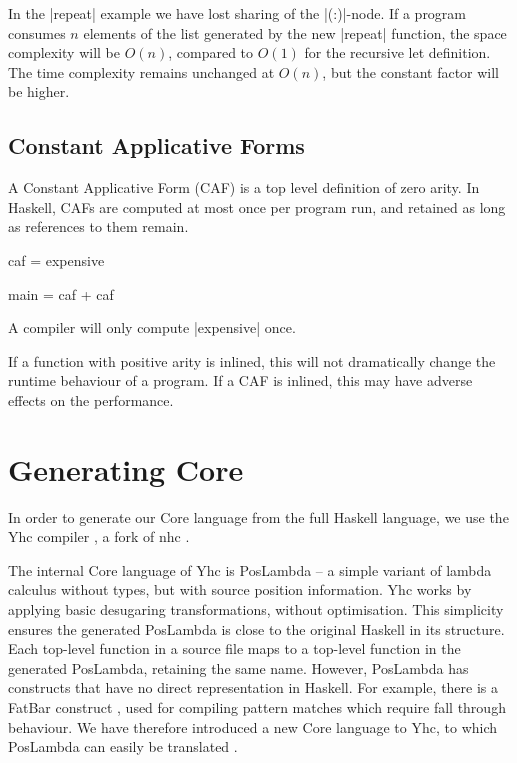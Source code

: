 In the |repeat| example we have lost sharing of the |(:)|-node. If a program consumes $n$ elements of the list generated by the new |repeat| function, the space complexity will be $O(n)$, compared to $O(1)$ for the recursive let definition. The time complexity remains unchanged at $O(n)$, but the constant factor will be higher.

 
\subsection{Constant Applicative Forms}

A Constant Applicative Form (CAF) is a top level definition of zero arity. In Haskell, CAFs are computed at most once per program run, and retained as long as references to them remain.

\begin{example}
\begin{code}
caf = expensive

main = caf + caf
\end{code}

A compiler will only compute |expensive| once.
\end{example}

If a function with positive arity is inlined, this will not dramatically change the runtime behaviour of a program. If a CAF is inlined, this may have adverse effects on the performance.


\section{Generating Core}
\label{secB:generating_core}

In order to generate our Core language from the full Haskell language, we use the Yhc compiler \cite{yhc}, a fork of nhc \cite{nhc}.

The internal Core language of Yhc is PosLambda -- a simple variant of lambda calculus without types, but with source position information. Yhc works by applying basic desugaring transformations, without optimisation. This simplicity ensures the generated PosLambda is close to the original Haskell in its structure. Each top-level function in a source file maps to a top-level function in the generated PosLambda, retaining the same name. However, PosLambda has constructs that have no direct representation in Haskell. For example, there is a FatBar construct \cite{spj:implementation}, used for compiling pattern matches which require fall through behaviour. We have therefore introduced a new Core language to Yhc, to which PosLambda can easily be translated \cite{me:yhc_core}.

